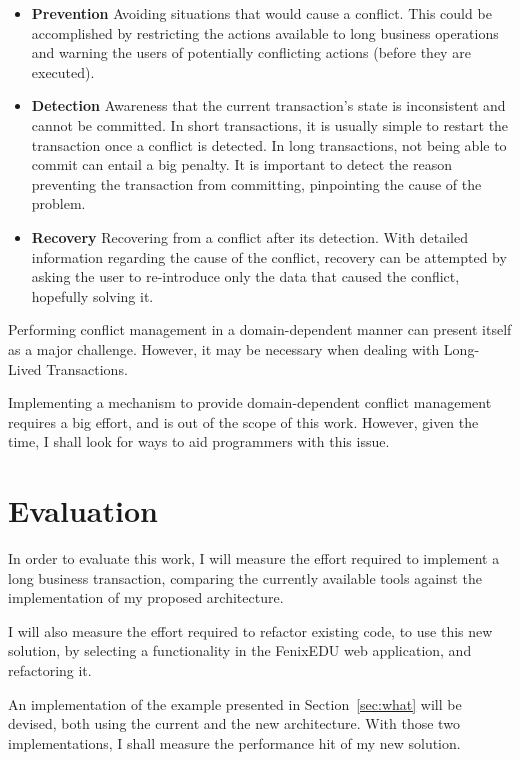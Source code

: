 \documentclass{llncs}
\begin{document}
\begin{itemize}

\item {\bf Prevention} Avoiding situations that would cause a
  conflict. This could be accomplished by restricting the actions
  available to long business operations and warning the users of
  potentially conflicting actions (before they are executed).

\item {\bf Detection} Awareness that the current transaction's state
  is inconsistent and cannot be committed. In short transactions, it
  is usually simple to restart the transaction once a conflict is
  detected. In long transactions, not being able to commit can entail
  a big penalty. It is important to detect the reason preventing the
  transaction from committing, pinpointing the cause of the problem.

\item {\bf Recovery} Recovering from a conflict after its
  detection. With detailed information regarding the cause of the
  conflict, recovery can be attempted by asking the user to
  re-introduce only the data that caused the conflict, hopefully
  solving it.

\end{itemize}

Performing conflict management in a domain-dependent manner can
present itself as a major challenge. However, it may be necessary when
dealing with Long-Lived Transactions.

Implementing a mechanism to provide domain-dependent conflict
management requires a big effort, and is out of the scope of this
work. However, given the time, I shall look for ways to aid
programmers with this issue.

\section{Evaluation}

In order to evaluate this work, I will measure the effort required to
implement a long business transaction, comparing the currently
available tools against the implementation of my proposed
architecture.

I will also measure the effort required to refactor existing code, to
use this new solution, by selecting a functionality in the FenixEDU
web application, and refactoring it.

An implementation of the example presented in Section~\ref{sec:what}
will be devised, both using the current and the new architecture. With
those two implementations, I shall measure the performance hit of my
new solution.
\end{document}
